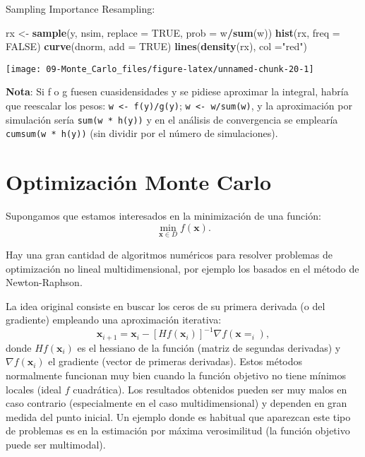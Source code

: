 \documentclass[
]{book}
\newenvironment{Shaded}{\begin{snugshade}}{\end{snugshade}}
\newcommand{\DataTypeTok}[1]{\textcolor[rgb]{0.13,0.29,0.53}{#1}}
\newcommand{\KeywordTok}[1]{\textcolor[rgb]{0.13,0.29,0.53}{\textbf{#1}}}
\newcommand{\NormalTok}[1]{#1}
\newcommand{\OperatorTok}[1]{\textcolor[rgb]{0.81,0.36,0.00}{\textbf{#1}}}
\newcommand{\OtherTok}[1]{\textcolor[rgb]{0.56,0.35,0.01}{#1}}
\newcommand{\StringTok}[1]{\textcolor[rgb]{0.31,0.60,0.02}{#1}}
\theoremstyle{break}
\theoremstyle{definition}
\theoremstyle{definition}
\theoremstyle{definition}
\theoremstyle{remark}
\begin{document}
Sampling Importance Resampling:

\begin{Shaded}
\begin{Highlighting}[]
\NormalTok{rx <-}\StringTok{ }\KeywordTok{sample}\NormalTok{(y, nsim, }\DataTypeTok{replace =} \OtherTok{TRUE}\NormalTok{, }\DataTypeTok{prob =}\NormalTok{ w}\OperatorTok{/}\KeywordTok{sum}\NormalTok{(w))}
\KeywordTok{hist}\NormalTok{(rx, }\DataTypeTok{freq =} \OtherTok{FALSE}\NormalTok{)}
\KeywordTok{curve}\NormalTok{(dnorm, }\DataTypeTok{add =} \OtherTok{TRUE}\NormalTok{)}
\KeywordTok{lines}\NormalTok{(}\KeywordTok{density}\NormalTok{(rx), }\DataTypeTok{col =}\StringTok{"red"}\NormalTok{)}
\end{Highlighting}
\end{Shaded}

\begin{center}\texttt{[image: 09-Monte\_Carlo\_files/figure-latex/unnamed-chunk-20-1]} \end{center}

\textbf{Nota}: Si f o g fuesen cuasidensidades y se pidiese aproximar la integral,
habría que reescalar los pesos: \texttt{w\ \textless{}-\ f(y)/g(y)}; \texttt{w\ \textless{}-\ w/sum(w)},
y la aproximación por simulación sería \texttt{sum(w\ *\ h(y))} y en el análisis
de convergencia se emplearía \texttt{cumsum(w\ *\ h(y))}
(sin dividir por el número de simulaciones).

\hypertarget{optimizaciuxf3n-monte-carlo}{%
\section{Optimización Monte Carlo}\label{optimizaciuxf3n-monte-carlo}}

Supongamos que estamos interesados en la minimización de una
función:
\[\underset{\mathbf{x}\in D}{\min }f(\mathbf{x}).\]

Hay una gran cantidad de algoritmos numéricos para resolver
problemas de optimización no lineal multidimensional, por ejemplo
los basados en el método de Newton-Raphson.

La idea original consiste en buscar los ceros de su primera derivada
(o del gradiente) empleando una aproximación
iterativa:
\[\mathbf{x}_{i+1} = \mathbf{x}_{i}-[Hf(\mathbf{x}_{i})]^{-1}\nabla f(\mathbf{x} = 
_{i}),\]donde \(Hf(\mathbf{x}_{i})\) es el hessiano de la función
(matriz de segundas derivadas) y \(\nabla f(\mathbf{x}_{i})\) el
gradiente (vector de primeras derivadas).
Estos métodos normalmente funcionan muy bien cuando la función
objetivo no tiene mínimos locales (ideal \(f\) cuadrática).
Los resultados obtenidos pueden ser muy malos en caso contrario
(especialmente en el caso multidimensional) y dependen en gran
medida del punto inicial.
Un ejemplo donde es habitual que aparezcan este tipo de problemas es
en la estimación por máxima verosimilitud (la función objetivo puede
ser multimodal).
\end{document}
